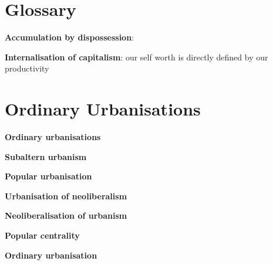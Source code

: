 \documentclass{article}
\begin{document}
\textbf{}

\section{Glossary}

\textbf{Accumulation by dispossession}:

\textbf{Internalisation of capitalism}: our self worth is directly defined by our productivity

\section{Ordinary Urbanisations}

\textbf{Ordinary urbanisations}

\textbf{Subaltern urbanism}

\textbf{Popular urbanisation}

\textbf{Urbanisation of neoliberalism}

\textbf{Neoliberalisation of urbanism}

\textbf{Popular centrality}

\textbf{Ordinary urbanisation}


\textbf{}


\textbf{}
\end{document}
